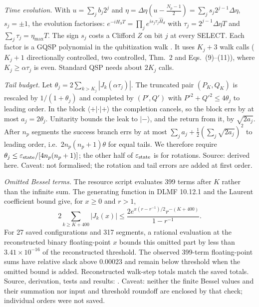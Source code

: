 \documentclass[11pt,a4paper]{article}
\begin{document}
\emph{Time evolution.} With $u=\sum_jb_j2^j$ and
$\eta=\Delta\eta(u-\tfrac{N_p-1}2)=\sum_j s_j2^{j-1}\Delta\eta$,
$s_j=\pm1$, the evolution factorises:
$e^{-iH_ST}=\prod_j e^{is_j\tau_j\hat H_d}$ with $\tau_j=2^{j-1}\Delta\eta T$
and $\sum_j\tau_j=\eta_{\max}T$. The sign $s_j$ costs a Clifford $Z$ on bit
$j$ at every SELECT. Each factor is a GQSP polynomial in the qubitization
walk \cite{motlaghwiebe2024,berry2024gqsp}. It uses $K_j+3$ walk calls ($K_j+1$ directionally controlled, two
controlled, \cite{berry2024gqsp} Thm.~2 and Eqs.~(9)--(11)), where $K_j\ge\alpha\tau_j$ is even. Standard QSP needs about
$2K_j$ calls.

\emph{Tail budget.} Let $\theta_j=2\sum_{k>K_j}|J_k(\alpha\tau_j)|$. The truncated pair $(P_K,Q_K)$ is
rescaled by $1/(1+\theta_j)$ and completed by $(P',Q')$ with $P'^2+Q'^2\le4\theta_j$ to leading order. In the block
$\langle+|\cdot|+\rangle$ the completion cancels, so the block errs by at most $a_j=2\theta_j$. Unitarity bounds the leak
to $|-\rangle$, and the return from it, by $\sqrt{2a_j}$. After $n_p$ segments the success branch errs by at most
$\sum_ja_j+\tfrac12(\sum_j\sqrt{2a_j})^2$ to leading order, i.e.\ $2n_p(n_p+1)\theta$ for equal tails. We therefore require
$\theta_j\le\varepsilon_{\rm state}/[4n_p(n_p+1)]$; the other half of $\varepsilon_{\rm state}$ is for rotations. Source:
derived here. Caveat: not formalised; the rotation and tail errors are added at first order.

\emph{Omitted Bessel terms.} The resource script evaluates 399 terms after
$K$ rather than the infinite sum. The generating function in DLMF 10.12.1
and the Laurent coefficient bound give, for $x\ge0$ and $r>1$,
\[
 2\sum_{k\ge K+400}|J_k(x)|\le
 \frac{2e^{x(r-r^{-1})/2}r^{-(K+400)}}{1-r^{-1}}.
\]
For 27 saved configurations and 317 segments, a rational evaluation at the
reconstructed binary floating-point $x$ bounds this omitted part by less
than $3.41\times10^{-16}$ of the reconstructed threshold. The observed
399-term floating-point sums have relative slack above $0.00023$ and remain
below threshold when the omitted bound is added. Reconstructed walk-step
totals match the saved totals. Source, derivation, tests and results:
. Caveat: neither the finite Bessel
values and their summation nor input and threshold roundoff are enclosed by
that check; individual orders were not saved.
\end{document}
